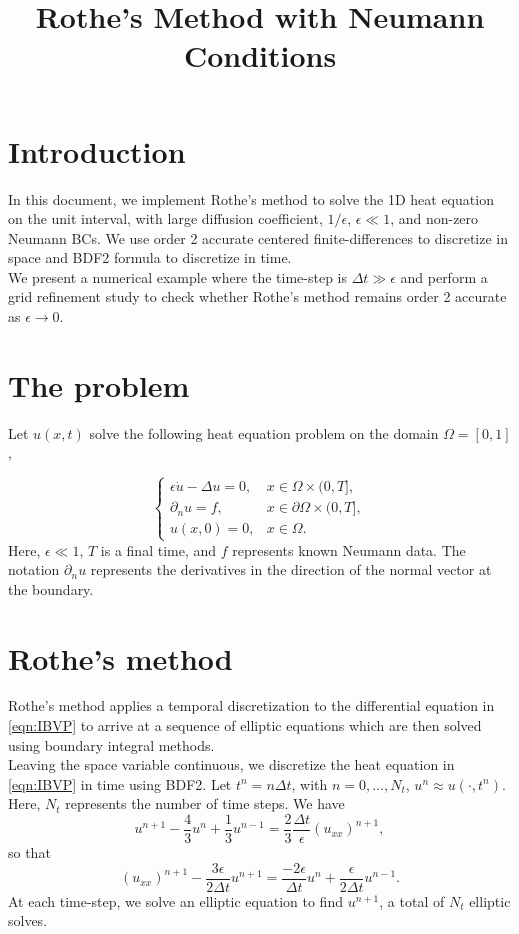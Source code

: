 \documentclass[11pt]{article}
\title{Rothe's Method with Neumann Conditions\vspace{-3ex}}
\numberwithin{equation}{section}
\newcommand{\pn}{\partial_n}
\newcommand{\dt}{\Delta t}
\begin{document}
\maketitle	

\section{Introduction}
In this document, we implement Rothe's method to solve the 1D heat equation on the unit interval, with large diffusion coefficient, $1/\epsilon$, $\epsilon\ll 1$,  and non-zero Neumann BCs. We use order 2 accurate centered finite-differences to discretize in space and BDF2 formula to discretize in time. \\

We present a numerical example where the time-step is $\dt\gg\epsilon$ and perform a grid refinement study to check whether Rothe's method remains order 2 accurate as $\epsilon \rightarrow 0$. 
\section{The problem}
Let $u(x,t)$ solve the following heat equation problem on the domain $\Omega = [0,1]$, 

\begin{equation}\label{eqn:IBVP}
\begin{cases}
\epsilon \dot{u} - \Delta u = 0, & x \in\Omega\times(0,T], \\ 
\pn u = f, & x \in\partial \Omega\times (0,T], \\
u(x,0) = 0, & x\in\Omega.
\end{cases}
\end{equation}
Here, $\epsilon\ll 1$, $T$ is a final time, and $f$ represents known Neumann data. The notation $\pn u$ represents the derivatives in the direction of the normal vector at the boundary. 

\section{Rothe's method}
Rothe's method applies a temporal discretization to the differential equation in \eqref{eqn:IBVP} to arrive at a sequence of elliptic equations which are then solved using boundary integral methods.\\ 

Leaving the space variable continuous, we discretize the heat equation in \eqref{eqn:IBVP} in time using BDF2. Let $t^n = n\dt$, with $n = 0, \dots, N_t$, $u^n \approx u(\cdot, t^n)$. Here, $N_t$ represents the number of time steps. We have
\begin{equation*}
u^{n+1} - \frac{4}{3}u^{n} + \frac{1}{3}u^{n - 1}  = \frac{2}{3}\frac{\dt}{\epsilon}(u_{xx})^{n+1}, 
\end{equation*}
so that 
\begin{equation}\label{eqn:ellipticEqns}
(u_{xx})^{n+1} - \frac{3\epsilon}{2\dt}u^{n+1} = \frac{-2\epsilon}{\dt}u^{n} + \frac{\epsilon}{2\dt}u^{n - 1}.
\end{equation}
At each time-step, we solve an elliptic equation to find $u^{n+1}$, a total of $N_t$ elliptic solves. \\
\end{document}

